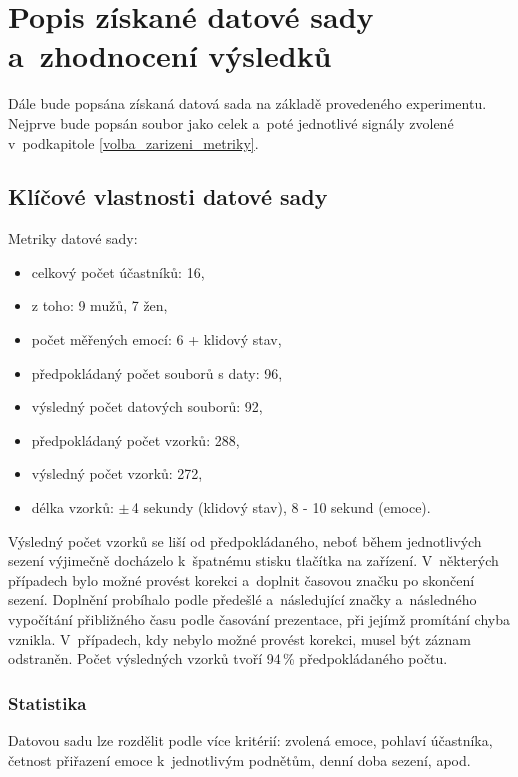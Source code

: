     \chapter{Popis získané datové sady a~zhodnocení výsledků}
    \label{vysledky}    
    Dále bude popsána získaná datová sada na základě provedeného experimentu. Nejprve bude popsán soubor jako celek a~poté jednotlivé signály zvolené v~podkapitole \ref{volba_zarizeni_metriky}.
    
    \section{Klíčové vlastnosti datové sady}
    
    Metriky datové sady:
    \begin{itemize}
        \item celkový počet účastníků: 16,
        \item z toho: 9 mužů, 7 žen,
        \item počet měřených emocí: 6 + klidový stav,
        \item předpokládaný počet souborů s daty: 96,
        \item výsledný počet datových souborů: 92,
        \item předpokládaný počet vzorků: 288,
        \item výsledný počet vzorků: 272,
        \item délka vzorků: $\pm$\,4 sekundy (klidový stav), 8 - 10 sekund (emoce).
    \end{itemize}
    
    Výsledný počet vzorků se liší od předpokládaného, neboť během jednotlivých sezení výjimečně docházelo k~špatnému stisku tlačítka na zařízení. V~některých případech bylo možné provést korekci a~doplnit časovou značku po skončení sezení. Doplnění probíhalo podle předešlé a~následující značky a~následného vypočítání přibližného času podle časování prezentace, při jejímž promítání chyba vznikla. V~případech, kdy nebylo možné provést korekci, musel být záznam odstraněn. Počet výsledných vzorků tvoří 94\,\% předpokládaného počtu.
    
    \subsection{Statistika}
    Datovou sadu lze rozdělit podle více kritérií: zvolená emoce, pohlaví účastníka, četnost přiřazení emoce k~jednotlivým podnětům, denní doba sezení, apod.
    
